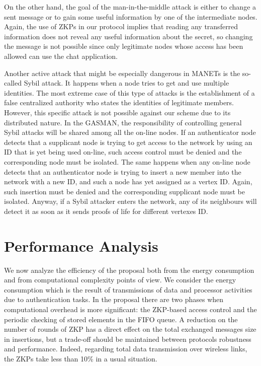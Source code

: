 \documentclass[conference]{IEEEtran}
\begin{document}
On the other hand, the goal of the man-in-the-middle
attack is  either to change a sent message or to gain some useful
information by one of the intermediate nodes. Again, the use of
ZKPs in our protocol implies that reading any transferred
information does not reveal any useful information about the
secret, so changing the message is not possible since only
legitimate nodes whose access has been allowed can use the chat
application.

Another active attack that might be especially dangerous in MANETs
is the so-called Sybil attack. It happens when a node tries to get
and use multiple identities. The most extreme case of this type of
attacks is the establishment of a false centralized authority who
states the identities of legitimate members. However, this
specific attack is not possible against our scheme due to its
distributed nature. In the GASMAN, the responsibility of
controlling general Sybil attacks will be shared among all the
on-line nodes. If an authenticator  node detects that a supplicant
node is trying to get access to the network by using an
 ID that is yet being used on-line, such access control must be denied and the corresponding node must be isolated. The same happens when any on-line node detects that
an authenticator node is trying to insert a new member into the
network with a new ID, and such a node has yet assigned as a vertex
ID. Again, such insertion must be denied and the corresponding
supplicant node must be isolated. Anyway, if a Sybil attacker
enters the network, any of its neighbours will detect it as soon
as it sends proofs of life for different vertexes ID.


\section{Performance Analysis}
\label{PerformanceAnalysis}
We now analyze the efficiency of the proposal both from the energy
consumption and from computational complexity points of view. We
consider the energy consumption which is the result of
transmissions of data and processor activities due to
authentication tasks. In the proposal there are two phases when
computational overhead is more significant: the ZKP-based access
control and the periodic checking of stored elements in the FIFO queue. A
reduction on the number of rounds of ZKP has a direct effect on
the total exchanged messages size in insertions, but a trade-off
should be maintained between protocols robustness and performance.
Indeed, regarding total data transmission over wireless links, the
ZKPs take less than 10\% in a usual situation.
\end{document}
